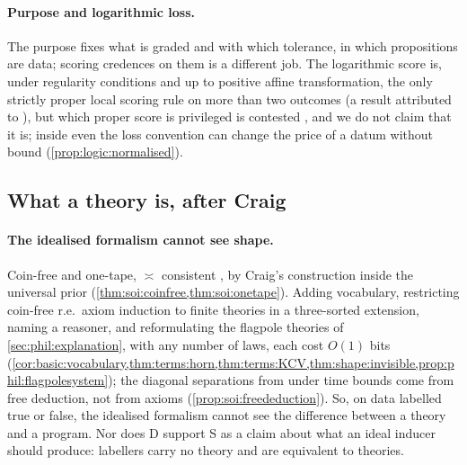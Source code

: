 \paragraph{Purpose and logarithmic loss.}\label{rem:phil:purpose}
The purpose fixes what is graded and with which tolerance, in \SAIabbr which propositions are data; scoring credences on them is a different job. The logarithmic score is, under regularity conditions and up to positive affine transformation, the only strictly proper local scoring rule on more than two outcomes (a result attributed to \citealp{bernardo1979expected}), but which proper score is privileged is contested \citep{leitgeb2010objective,pettigrew2016accuracy}, and we do not claim that it is; inside \SAIabbr even the loss convention can change the price of a datum without bound (\cref{prop:logic:normalised}).

\subsection{What a theory is, after Craig}\label{sec:phil:craig}

\paragraph{The idealised formalism cannot see shape.}\label{rem:phil:craig}
Coin-free and one-tape, \SAIabbr $\asymp$ consistent \SOIabbr, by Craig's construction inside the universal prior (\cref{thm:soi:coinfree,thm:soi:onetape}). Adding vocabulary, restricting coin-free r.e.\ axiom induction to finite theories in a three-sorted extension, naming a reasoner, and reformulating the flagpole theories of \cref{sec:phil:explanation}, with any number of laws, each cost $O(1)$ bits (\cref{cor:basic:vocabulary,thm:terms:horn,thm:terms:KCV,thm:shape:invisible,prop:phil:flagpolesystem}); the diagonal separations from \SOIabbr under time bounds come from free deduction, not from axioms (\cref{prop:soi:freededuction}). So, on data labelled true or false, the idealised formalism cannot see the difference between a theory and a program. Nor does D support S as a claim about what an ideal inducer should produce: labellers carry no theory and are equivalent to theories.

